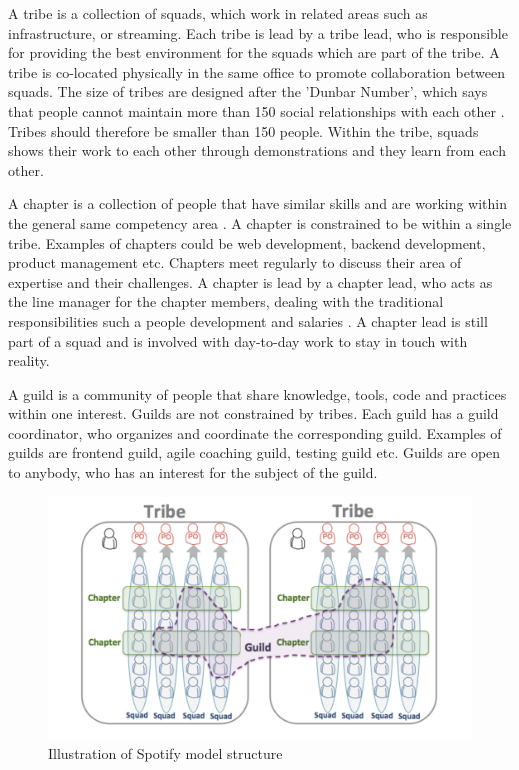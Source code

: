 \documentclass[11pt,a4paper]{report}
\begin{document}
A tribe is a collection of squads, which work in related areas such as infrastructure, or streaming. Each tribe is lead by a tribe lead, who is responsible for providing the best environment for the squads which are part of the tribe. A tribe is co-located physically in the same office to promote collaboration between squads. The size of tribes are designed after the 'Dunbar Number', which says that people cannot maintain more than 150 social relationships with each other \cite{dunbar2010many}. Tribes should therefore be smaller than 150 people. Within the tribe, squads shows their work to each other through demonstrations and they learn from each other. 

A chapter is a collection of people that have similar skills and are working within the general same competency area \cite{spotifyMethod}. A chapter is constrained to be within a single tribe. Examples of chapters could be web development, backend development, product management etc. Chapters meet regularly to discuss their area of expertise and their challenges. A chapter is lead by a chapter lead, who acts as the line manager for the chapter members, dealing with the traditional responsibilities such a people development and salaries \cite{spotifyMethod}. A chapter lead is still part of a squad and is involved with day-to-day work to stay in touch with reality. 

A guild is a community of people that share knowledge, tools, code and practices within one interest. Guilds are not constrained by tribes. Each guild has a guild coordinator, who organizes and coordinate the corresponding guild. Examples of guilds are frontend guild, agile coaching guild, testing guild etc. Guilds are open to anybody, who has an interest for the subject of the guild.

\begin{figure}[!h]
    \centering
    \includegraphics[scale=0.6]{SpotifyModelVisual.png}
    \caption{Illustration of Spotify model structure \cite{spotifyMethod}}
    \label{spotifyModelVisualFig}
\end{figure}
\end{document}
